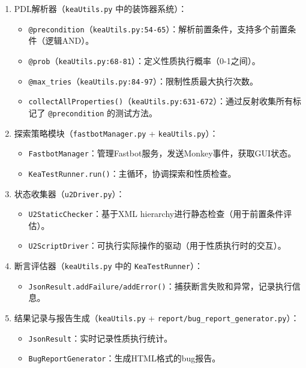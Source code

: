 \documentclass[a4paper, zihao=-4]{ctexart}
\newcommand{\bff}[1]{{\heiti #1}}
\begin{document}
\begin{enumerate}
    \item \bff{PDL解析器}（\texttt{keaUtils.py} 中的装饰器系统）：
    \begin{itemize}
        \item \texttt{@precondition}（\texttt{keaUtils.py:54-65}）：解析前置条件，支持多个前置条件（逻辑AND）。
        \item \texttt{@prob}（\texttt{keaUtils.py:68-81}）：定义性质执行概率（0-1之间）。
        \item \texttt{@max\_tries}（\texttt{keaUtils.py:84-97}）：限制性质最大执行次数。
        \item \texttt{collectAllProperties()}（\texttt{keaUtils.py:631-672}）：通过反射收集所有标记了 \texttt{@precondition} 的测试方法。
    \end{itemize}
    
    \item \bff{探索策略模块}（\texttt{fastbotManager.py} + \texttt{keaUtils.py}）：
    \begin{itemize}
        \item \texttt{FastbotManager}：管理Fastbot服务，发送Monkey事件，获取GUI状态。
        \item \texttt{KeaTestRunner.run()}：主循环，协调探索和性质检查。
    \end{itemize}
    
    \item \bff{状态收集器}（\texttt{u2Driver.py}）：
    \begin{itemize}
        \item \texttt{U2StaticChecker}：基于XML hierarchy进行静态检查（用于前置条件评估）。
        \item \texttt{U2ScriptDriver}：可执行实际操作的驱动（用于性质执行时的交互）。
    \end{itemize}
    
    \item \bff{断言评估器}（\texttt{keaUtils.py} 中的 \texttt{KeaTestRunner}）：
    \begin{itemize}
        \item \texttt{JsonResult.addFailure/addError()}：捕获断言失败和异常，记录执行信息。
    \end{itemize}
    
    \item \bff{结果记录与报告生成}（\texttt{keaUtils.py} + \texttt{report/bug\_report\_generator.py}）：
    \begin{itemize}
        \item \texttt{JsonResult}：实时记录性质执行统计。
        \item \texttt{BugReportGenerator}：生成HTML格式的bug报告。
    \end{itemize}
\end{enumerate}
\end{document}
